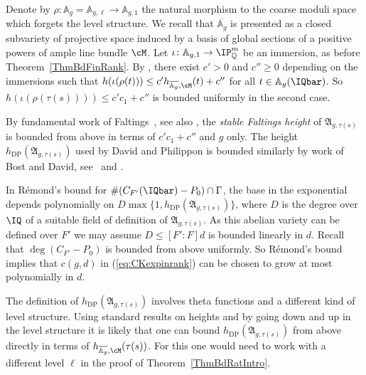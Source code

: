 Denote by $\rho \colon \mathbb{A}_g = \mathbb{A}_{g,\ell} \rightarrow
\mathbb{A}_{g,1}$ the natural morphism to the coarse moduli space which forgets the level structure.
We recall that
$\overline{\mathbb{A}_g}$ %
is presented as a closed subvariety
of
projective space induced by a basis of global sections of a positive
powers of ample line bundle $\cM$. Let
$\iota\colon\mathbb{A}_{g,1}\rightarrow\IP_{\mathbb{Q}}^m$ be an
immersion, as before Theorem~\ref{ThmBdFinRank}.
By
\cite[Lemma~4]{Silverman:heightest11}, there exist $c' > 0 $ and $c''
\ge 0$ depending on the immersions such that
$h(\iota(\rho(t))) \le c'
h_{\overline{\mathbb{A}_g},\cM}(t) + c''$ for all $t\in
\mathbb{A}_g(\IQbar)$.
So $h(\iota(\rho(\tau(s)))) \le c'c_1+c''$
is bounded uniformly in the second case.

By fundamental work of Faltings~\cite[$\mathsection 3$ including
 the proof of Lemma~3]{Faltings:ES}, see also
\cite[the remarks below Proposition~V.4.4 and Proposition~V.4.5]{FaltingsChai}, the \textit{stable Faltings height} of
$\mathfrak{A}_{g,\tau(s)}$ is bounded from above in terms of
$c'c_1+c''$ and $g$ only.
The height $h_{\mathrm{DP}}(\mathfrak{A}_{g,\tau(s)})$ used by David and
Philippon is bounded similarly by work of Bost and David,
see~\cite[Corollaire~6.9]{DPvarabII} and \cite{Pazuki:12}.

In R\'emond's bound  \cite[page 643]{DPvarabII}
for $\#(C_{F'}(\IQbar)-P_0)\cap \Gamma$,
the base in the exponential depends polynomially on
$D\max\{1,h_{\mathrm{DP}}(\mathfrak{A}_{g,\tau(s)})\}$,
where $D$ is the degree over
$\IQ$ of a suitable field of definition of $\mathfrak{A}_{g,\tau(s)}$.
As this abelian variety can be defined over $F'$ we may assume $D\le
[F':F]d$ is bounded linearly in $d$.
Recall that $\deg (C_{F'}-P_0)$ is bounded from above uniformly.
So R\'emond's bound implies that  $c(g,d)$
in (\ref{eq:CKexpinrank}) can be chosen to grow at most
polynomially in $d$.

The definition of $h_{\mathrm{DP}}(\mathfrak{A}_{g,\tau(s)})$
involves  theta functions and a different kind of level structure.
Using standard results on heights and by
going down and up in the level structure it is likely that one can
bound $h_{\mathrm{DP}}(\mathfrak{A}_{g,\tau(s)})$ from above directly in terms of
$h_{\overline{\mathbb{A}_g},\cM}(\tau(s))$. For this one would need to
work with a different level $\ell$ in the proof of
Theorem~\ref{ThmBdRatIntro}.

